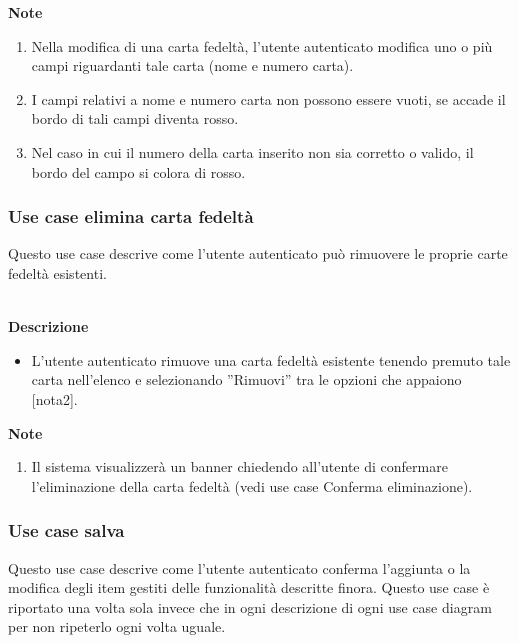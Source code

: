 \documentclass[a4paper,12pt]{article}
\begin{document}
\textbf{Note}
\begin{enumerate} \setlength\itemsep{0.01em}
\item Nella modifica di una carta fedeltà, l'utente autenticato modifica uno o più campi riguardanti tale carta  (nome e numero carta).
\item I campi relativi a nome e numero carta non possono essere vuoti, se accade il bordo di tali campi diventa rosso.
\item Nel caso in cui il numero della carta inserito non sia corretto o valido, il bordo del campo si colora di rosso.
\end{enumerate}



\subsubsection*{Use case elimina carta fedeltà}

 Questo use case descrive come l'utente autenticato può rimuovere le proprie carte fedeltà esistenti.
 
\textbf{\\Descrizione}
\begin{itemize} \setlength\itemsep{0.01em}
\item L'utente autenticato rimuove una carta fedeltà esistente tenendo premuto tale carta nell'elenco e selezionando ''Rimuovi'' tra le opzioni che appaiono [nota2].
\end{itemize}

\textbf{Note}
\begin{enumerate} \setlength\itemsep{0.01em}
\item Il sistema visualizzerà un banner chiedendo all'utente di confermare l'eliminazione della carta fedeltà  (vedi use case Conferma eliminazione).
\end{enumerate}



\vspace{1cm}






\subsubsection*{Use case salva}

 Questo use case descrive come l'utente autenticato conferma l'aggiunta o la modifica degli item gestiti delle funzionalità descritte finora.
 Questo use case è riportato una volta sola invece che in ogni descrizione di ogni use case diagram per non ripeterlo ogni volta uguale. 
 
\end{document}

